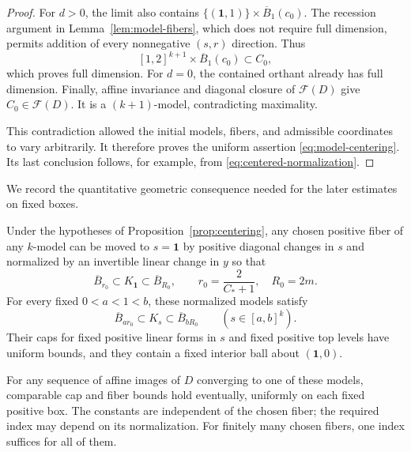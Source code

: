\begin{proof}
For $d>0$, the limit also contains
$\{(\mathbf1,1)\}\times\overline B_1(c_0)$.
The recession argument in Lemma~\ref{lem:model-fibers}, which does
not require full dimension, permits addition of every nonnegative
$(s,r)$ direction.  Thus
\[
 [1,2]^{k+1}\times\overline B_1(c_0)\subset C_0,
\]
which proves full dimension.  For $d=0$, the contained orthant
already has full dimension.  Finally, affine invariance and diagonal
closure of $\mathcal F(D)$ give $C_0\in\mathcal F(D)$.
It is a $(k+1)$-model, contradicting maximality.

This contradiction allowed the initial models, fibers, and
admissible coordinates to vary arbitrarily.  It therefore proves
the uniform assertion \eqref{eq:model-centering}.
Its last conclusion follows, for example, from
\eqref{eq:centered-normalization}.
\end{proof}

We record the quantitative geometric consequence needed for the
later estimates on fixed boxes.

\begin{corollary}\label{cor:normalized-fibers}
Under the hypotheses of Proposition~\ref{prop:centering}, any
chosen positive fiber of any $k$-model can be moved to $s=\mathbf1$
by positive diagonal changes in $s$ and normalized by an invertible
linear change in $y$ so that
\[
 \overline B_{r_0}\subset K_{\mathbf1}
 \subset\overline B_{R_0},
 \qquad r_0=\frac2{C_*+1},\quad R_0=2m.
\]
For every fixed $0<a<1<b$, these normalized models satisfy
\begin{equation}\label{eq:normalized-fiber-box}
 \overline B_{ar_0}\subset K_s
 \subset\overline B_{bR_0}
 \qquad(s\in[a,b]^k).
\end{equation}
Their caps for fixed positive linear forms in $s$ and fixed positive top
levels have uniform bounds, and they contain a fixed interior ball
about $(\mathbf1,0)$.

For any sequence of affine images of $D$ converging to one of these
models, comparable cap and fiber bounds hold eventually, uniformly
on each fixed positive box.  The constants are independent of the
chosen fiber; the required index may depend on its normalization.
For finitely many chosen fibers, one index suffices for all of them.
\end{corollary}

